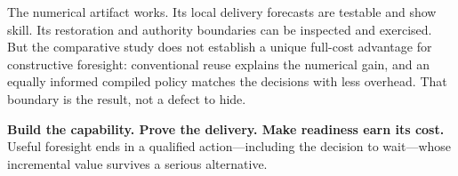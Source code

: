 \documentclass[11pt,a4paper]{article}
\begin{document}
The numerical artifact works. Its local delivery forecasts are testable and show skill. Its restoration and authority boundaries can be inspected and exercised. But the comparative study does not establish a unique full-cost advantage for constructive foresight: conventional reuse explains the numerical gain, and an equally informed compiled policy matches the decisions with less overhead. That boundary is the result, not a defect to hide.

\begin{claimbox}
\textbf{Build the capability. Prove the delivery. Make readiness earn its cost.}\\[3pt]
Useful foresight ends in a qualified action---including the decision to wait---whose incremental value survives a serious alternative.
\end{claimbox}


\clearpage
\end{document}
